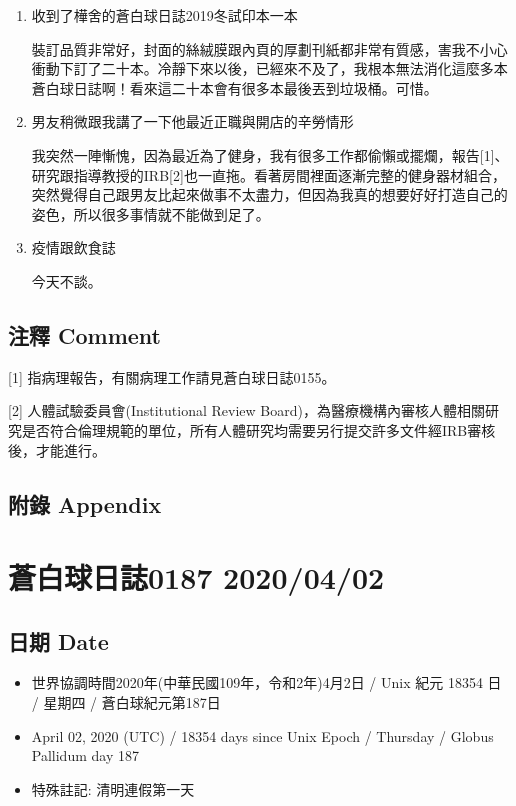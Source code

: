 \documentclass[a5paper, 11pt
]{book}
\providecommand{\tightlist}{%
  \setlength{\itemsep}{0pt}\setlength{\parskip}{0pt}}
\begin{document}
\begin{enumerate}
\def\labelenumi{\arabic{enumi}.}
\item
  收到了樺舍的蒼白球日誌2019冬試印本一本

  裝訂品質非常好，封面的絲絨膜跟內頁的厚劃刊紙都非常有質感，害我不小心衝動下訂了二十本。冷靜下來以後，已經來不及了，我根本無法消化這麼多本蒼白球日誌啊！看來這二十本會有很多本最後丟到垃圾桶。可惜。
\item
  男友稍微跟我講了一下他最近正職與開店的辛勞情形

  我突然一陣慚愧，因為最近為了健身，我有很多工作都偷懶或擺爛，報告{[}1{]}、研究跟指導教授的IRB{[}2{]}也一直拖。看著房間裡面逐漸完整的健身器材組合，突然覺得自己跟男友比起來做事不太盡力，但因為我真的想要好好打造自己的姿色，所以很多事情就不能做到足了。
\item
  疫情跟飲食誌

  今天不談。
\end{enumerate}

\hypertarget{ux6ce8ux91cb-comment-31}{%
\subsection{注釋 Comment}\label{ux6ce8ux91cb-comment-31}}

{[}1{]} 指病理報告，有關病理工作請見蒼白球日誌0155。

{[}2{]} 人體試驗委員會(Institutional Review
Board)，為醫療機構內審核人體相關研究是否符合倫理規範的單位，所有人體研究均需要另行提交許多文件經IRB審核後，才能進行。

\hypertarget{ux9644ux9304-appendix-31}{%
\subsection{附錄 Appendix}\label{ux9644ux9304-appendix-31}}

\hypertarget{ux84bcux767dux7403ux65e5ux8a8c0187-20200402}{%
\section{蒼白球日誌0187
2020/04/02}\label{ux84bcux767dux7403ux65e5ux8a8c0187-20200402}}

\hypertarget{ux65e5ux671f-date-32}{%
\subsection{日期 Date}\label{ux65e5ux671f-date-32}}

\begin{itemize}
\tightlist
\item
  世界協調時間2020年(中華民國109年，令和2年)4月2日 / Unix 紀元 18354 日
  / 星期四 / 蒼白球紀元第187日
\item
  April 02, 2020 (UTC) / 18354 days since Unix Epoch / Thursday / Globus
  Pallidum day 187
\item
  特殊註記: 清明連假第一天
\end{itemize}
\end{document}
